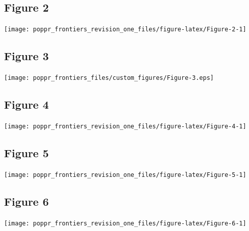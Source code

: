 \documentclass{frontiersSCNS} %
\newenvironment{CodeChunk}{}{}
\begin{document}
\subsection*{Figure 2}\label{figure-2}

\begin{CodeChunk}

\texttt{[image: poppr\_frontiers\_revision\_one\_files/figure-latex/Figure-2-1]} \end{CodeChunk}

\subsection*{Figure 3}\label{figure-3}

\texttt{[image: poppr\_frontiers\_files/custom\_figures/Figure-3.eps]}

\subsection*{Figure 4}\label{figure-4}

\begin{CodeChunk}

\texttt{[image: poppr\_frontiers\_revision\_one\_files/figure-latex/Figure-4-1]} \end{CodeChunk}

\subsection*{Figure 5}\label{figure-5}

\begin{CodeChunk}

\texttt{[image: poppr\_frontiers\_revision\_one\_files/figure-latex/Figure-5-1]} \end{CodeChunk}

\subsection*{Figure 6}\label{figure-6}

\begin{CodeChunk}

\texttt{[image: poppr\_frontiers\_revision\_one\_files/figure-latex/Figure-6-1]} \end{CodeChunk}
\end{document}
